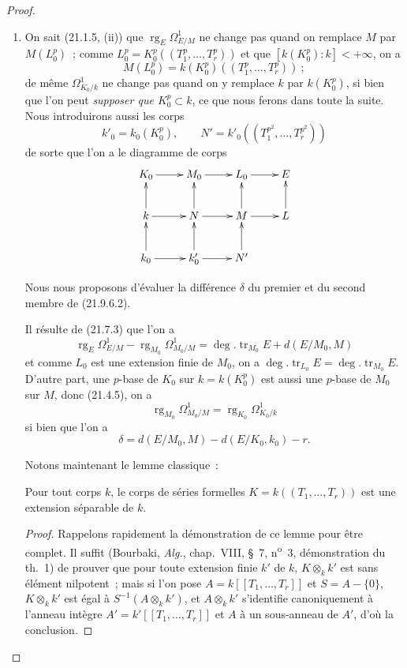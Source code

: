 \begin{proof}
\begin{enumerate}
  \item[(i)] On sait (21.1.5, (ii)) que
  $\operatorname{rg}_E\Omega^1_{E/M}$ ne change pas quand on remplace $M$ par
  $M(L_0^p)$~; comme
  $L_0^p=K_0^p((T_1^p,\ldots,T_r^p))$ et que
  $[k(K_0^p):k]<+\infty$, on a
  \[
    M(L_0^p)=k(K_0^p)((T_1^p,\ldots,T_r^p))~;
  \]
  de même $\Omega^1_{K_0/k}$ ne change pas quand on y remplace $k$ par
  $k(K_0^p)$, si bien que l'on peut \emph{supposer que $K_0^p\subset k$}, ce
  que nous ferons dans toute la suite. Nous introduirons aussi les corps
  \[
    k'_0=k_0(K_0^p),\qquad
    N'=k'_0((T_1^{p^2},\ldots,T_r^{p^2}))
  \]
  de sorte que l'on a le diagramme de corps
  \[
    \xymatrix{
      K_0\ar[r] & M_0\ar[r] & L_0\ar[r] & E\\
      k\ar[u]\ar[r] & N\ar[u]\ar[r] & M\ar[u]\ar[r] & L\ar[u]\\
      k_0\ar[u]\ar[r] & k'_0\ar[u]\ar[r] & N'\ar[u] &
    }
  \]

  Nous nous proposons d'évaluer la différence $\delta$ du premier et du
  second membre de (21.9.6.2).

  Il résulte de (21.7.3) que l'on a
  \[
    \operatorname{rg}_E\Omega^1_{E/M}
    -\operatorname{rg}_{M_0}\Omega^1_{M_0/M}
    =\deg.\operatorname{tr}_{M_0}E+d(E/M_0,M)
  \]
  et comme $L_0$ est une extension finie de $M_0$, on a
  $\deg.\operatorname{tr}_{L_0}E=\deg.\operatorname{tr}_{M_0}E$. D'autre
  part, une $p$-base de $K_0$ sur $k=k(K_0^p)$ est aussi une $p$-base de
  $M_0$ sur $M$, donc (21.4.5), on a
  \[
    \operatorname{rg}_{M_0}\Omega^1_{M_0/M}
    =\operatorname{rg}_{K_0}\Omega^1_{K_0/k}
  \]
  si bien que l'on a
  \begin{equation}
  \tag{21.9.6.3}
  \label{0.21.9.6.3-fr}
    \delta=d(E/M_0,M)-d(E/K_0,k_0)-r.
  \end{equation}

  Notons maintenant le lemme classique~:

  \begin{lemma}[21.9.6.4]
  \label{0.21.9.6.4-fr}
  Pour tout corps $k$, le corps de séries formelles
  $K=k((T_1,\ldots,T_r))$ est une extension séparable de $k$.
  \end{lemma}

  \begin{proof}
  Rappelons rapidement la démonstration de ce lemme pour être complet. Il
  suffit (Bourbaki, \emph{Alg.}, chap.~VIII, \S~7,
  n\textsuperscript{o}~3, démonstration du th.~1) de prouver que pour toute
  extension finie $k'$ de $k$, $K\otimes_k k'$ est sans élément nilpotent~;
  mais si l'on pose $A=k[[T_1,\ldots,T_r]]$ et $S=A-\{0\}$,
  $K\otimes_k k'$ est égal à $S^{-1}(A\otimes_k k')$, et
  $A\otimes_k k'$ s'identifie canoniquement à l'anneau intègre
  $A'=k'[[T_1,\ldots,T_r]]$ et $A$ à un sous-anneau de $A'$, d'où la
  conclusion.
  \end{proof}


\end{enumerate}
\end{proof}
